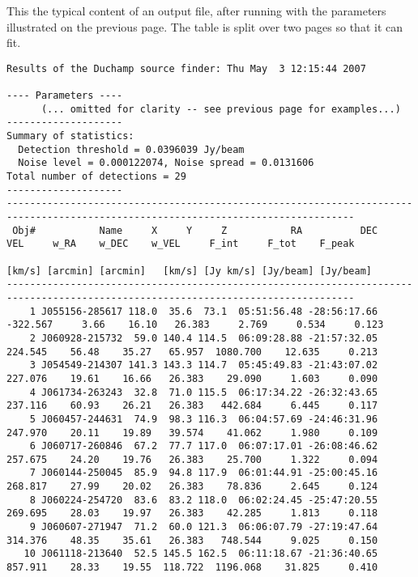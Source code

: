 \begin{landscape}
\label{app-output}
This the typical content of an output file, after running \duchamp
with the parameters illustrated on the previous page. The table is
split over two pages so that it can fit.

{\tiny 
  \begin{verbatim}
Results of the Duchamp source finder: Thu May  3 12:15:44 2007

---- Parameters ----
      (... omitted for clarity -- see previous page for examples...)
--------------------
Summary of statistics:
  Detection threshold = 0.0396039 Jy/beam
  Noise level = 0.000122074, Noise spread = 0.0131606
Total number of detections = 29
--------------------
----------------------------------------------------------------------------------------------------------------------------------
 Obj#           Name     X     Y     Z           RA          DEC      VEL     w_RA    w_DEC    w_VEL     F_int     F_tot    F_peak
                                                                   [km/s] [arcmin] [arcmin]   [km/s] [Jy km/s] [Jy/beam] [Jy/beam]
----------------------------------------------------------------------------------------------------------------------------------
    1 J055156-285617 118.0  35.6  73.1  05:51:56.48 -28:56:17.66 -322.567     3.66    16.10   26.383     2.769     0.534     0.123
    2 J060928-215732  59.0 140.4 114.5  06:09:28.88 -21:57:32.05  224.545    56.48    35.27   65.957  1080.700    12.635     0.213
    3 J054549-214307 141.3 143.3 114.7  05:45:49.83 -21:43:07.02  227.076    19.61    16.66   26.383    29.090     1.603     0.090
    4 J061734-263243  32.8  71.0 115.5  06:17:34.22 -26:32:43.65  237.116    60.93    26.21   26.383   442.684     6.445     0.117
    5 J060457-244631  74.9  98.3 116.3  06:04:57.69 -24:46:31.96  247.970    20.11    19.89   39.574    41.062     1.980     0.109
    6 J060717-260846  67.2  77.7 117.0  06:07:17.01 -26:08:46.62  257.675    24.20    19.76   26.383    25.700     1.322     0.094
    7 J060144-250045  85.9  94.8 117.9  06:01:44.91 -25:00:45.16  268.817    27.99    20.02   26.383    78.836     2.645     0.124
    8 J060224-254720  83.6  83.2 118.0  06:02:24.45 -25:47:20.55  269.695    28.03    19.97   26.383    42.285     1.813     0.118
    9 J060607-271947  71.2  60.0 121.3  06:06:07.79 -27:19:47.64  314.376    48.35    35.61   26.383   748.544     9.025     0.150
   10 J061118-213640  52.5 145.5 162.5  06:11:18.67 -21:36:40.65  857.911    28.33    19.55  118.722  1196.068    31.825     0.410

\end{verbatim}}
\end{landscape}
